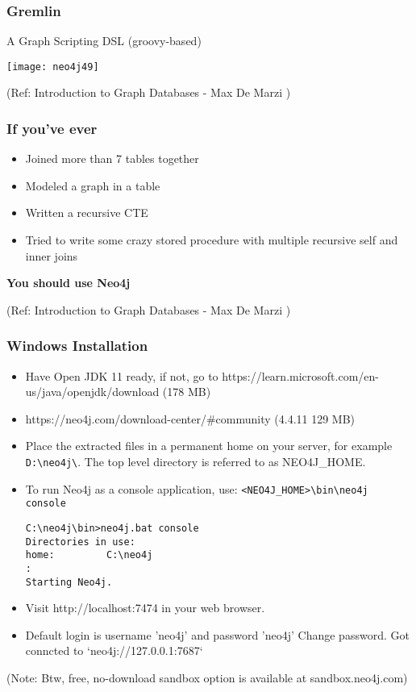 \begin{frame}\frametitle{Gremlin}

A Graph Scripting DSL (groovy-based)

\begin{center}
\texttt{[image: neo4j49]}
\end{center}	

{\tiny (Ref: Introduction to Graph Databases - Max De Marzi )}
\end{frame}

\begin{frame}\frametitle{If you’ve ever}

\begin{itemize}
\item Joined more than 7 tables together
\item  Modeled a graph in a table
\item  Written a recursive CTE
\item Tried to write some crazy stored procedure with multiple recursive self and inner joins
\end{itemize}

{\bf You should use Neo4j}

{\tiny (Ref: Introduction to Graph Databases - Max De Marzi )}
\end{frame}


\begin{frame}[fragile]\frametitle{Windows Installation}

\begin{itemize}
\item Have Open JDK 11 ready, if not, go to https://learn.microsoft.com/en-us/java/openjdk/download (178 MB)
\item https://neo4j.com/download-center/\#community (4.4.11 129 MB)
\item Place the extracted files in a permanent home on your server, for example \lstinline|D:\neo4j\|. The top level directory is referred to as NEO4J\_HOME.
\item To run Neo4j as a console application, use: \lstinline|<NEO4J_HOME>\bin\neo4j console|

\begin{lstlisting}
C:\neo4j\bin>neo4j.bat console
Directories in use:
home:         C:\neo4j
:
Starting Neo4j.
\end{lstlisting}

\item Visit http://localhost:7474 in your web browser.
\item Default login is username 'neo4j' and password 'neo4j' Change password. Got conncted to `neo4j://127.0.0.1:7687`
\end{itemize}

(Note: Btw, free, no-download sandbox option is available at sandbox.neo4j.com)
\end{frame}

